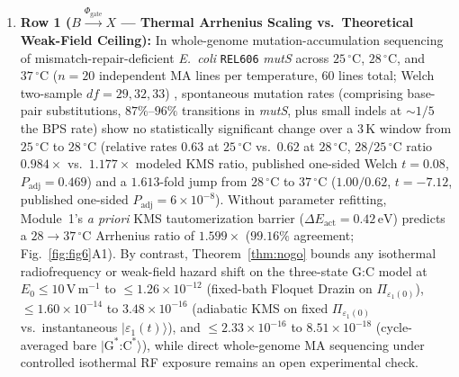 \documentclass[10pt,letterpaper]{article}
\theoremstyle{plain}
\theoremstyle{definition}
\begin{document}
\begin{enumerate}[leftmargin=1.8em,itemsep=2pt]
    \item \textbf{Row 1 ($B \xrightarrow{\Phi_{\mathrm{gate}}} X$ --- Thermal Arrhenius Scaling vs.\ Theoretical Weak-Field Ceiling):} In whole-genome mutation-accumulation sequencing of mismatch-repair-deficient \emph{E.\ coli} \texttt{REL606} \emph{mutS} across $25\,^\circ\mathrm{C}$, $28\,^\circ\mathrm{C}$, and $37\,^\circ\mathrm{C}$ ($n = 20$ independent MA lines per temperature, $60$ lines total; Welch two-sample $df = 29, 32, 33$) \cite{chu2018bmcevol}, spontaneous mutation rates (comprising base-pair substitutions, $87\%$--$96\%$ transitions in \emph{mutS}, plus small indels at $\sim 1/5$ the BPS rate) show no statistically significant change over a $3\,\mathrm{K}$ window from $25\,^\circ\mathrm{C}$ to $28\,^\circ\mathrm{C}$ (relative rates $0.63$ at $25\,^\circ\mathrm{C}$ vs.\ $0.62$ at $28\,^\circ\mathrm{C}$, $28/25\,^\circ\mathrm{C}$ ratio $0.984\times$ vs.\ $1.177\times$ modeled KMS ratio, published one-sided Welch $t = 0.08$, $P_{\mathrm{adj}} = 0.469$) and a $1.613$-fold jump from $28\,^\circ\mathrm{C}$ to $37\,^\circ\mathrm{C}$ ($1.00 / 0.62$, $t = -7.12$, published one-sided $P_{\mathrm{adj}} = 6 \times 10^{-8}$). Without parameter refitting, Module~1's \emph{a priori} KMS tautomerization barrier ($\Delta E_{\mathrm{act}} = 0.42\,\mathrm{eV}$) predicts a $28 \to 37\,^\circ\mathrm{C}$ Arrhenius ratio of $1.599\times$ ($99.16\%$ agreement; Fig.~\ref{fig:fig6}A1). By contrast, Theorem~\ref{thm:nogo} bounds any isothermal radiofrequency or weak-field hazard shift on the three-state G:C model at $E_0 \le 10\,\mathrm{V\,m^{-1}}$ to $\le 1.26 \times 10^{-12}$ (fixed-bath Floquet Drazin on $\Pi_{\varepsilon_1(0)}$), $\le 1.60 \times 10^{-14}$ to $3.48 \times 10^{-16}$ (adiabatic KMS on fixed $\Pi_{\varepsilon_1(0)}$ vs.\ instantaneous $|\varepsilon_1(t)\rangle$), and $\le 2.33 \times 10^{-16}$ to $8.51 \times 10^{-18}$ (cycle-averaged bare $|\mathrm{G}^*\text{:}\mathrm{C}^*\rangle$), while direct whole-genome MA sequencing under controlled isothermal RF exposure remains an open experimental check.

\end{enumerate}
\end{document}
